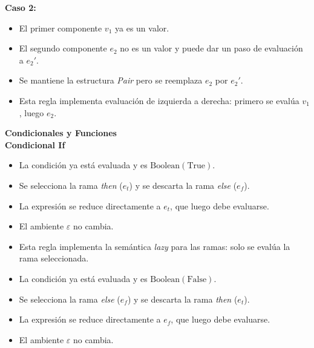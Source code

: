 \documentclass[a4paper,12pt]{article}
\begin{document}
\begin{tcolorbox}[title= Correción: Reglas de paso pequeño LAMBDAE   MÓDULO A5,breakable]
\textbf{Caso 2:}
\begin{itemize}
    \item El primer componente $v_1$ ya es un valor.
    \item El segundo componente $e_2$ no es un valor y puede dar un paso de evaluación a $e_2'$.
\end{itemize}

\begin{itemize}
    \item Se mantiene la estructura \textit{Pair} pero se reemplaza $e_2$ por $e_2'$.

    \item Esta regla implementa evaluación de izquierda a derecha: primero se evalúa $v_1$, luego $e_2$.

\end{itemize}

\textbf{Condicionales y Funciones}\\

\textbf{Condicional If}
\begin{center}
\begin{mathpar}
\end{mathpar}
\end{center}
\begin{itemize}
    \item La condición ya está evaluada y es $\text{Boolean}(\text{True})$.
    \item Se selecciona la rama \textit{then} ($e_t$) y se descarta la rama \textit{else} ($e_f$).
    \item La expresión se reduce directamente a $e_t$, que luego debe evaluarse.
    \item El ambiente $\varepsilon$ no cambia.
    \item Esta regla implementa la semántica \textit{lazy} para las ramas: solo se evalúa la rama seleccionada.
\end{itemize}

\begin{center}
\begin{mathpar}
\end{mathpar}
\end{center}

\begin{itemize}
    \item La condición ya está evaluada y es $\text{Boolean}(\text{False})$.
    \item Se selecciona la rama \textit{else} ($e_f$) y se descarta la rama \textit{then} ($e_t$).
    \item La expresión se reduce directamente a $e_f$, que luego debe evaluarse.
    \item El ambiente $\varepsilon$ no cambia.
\end{itemize}


\end{tcolorbox}
\end{document}
